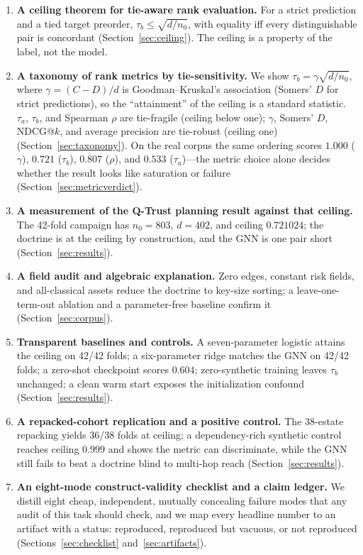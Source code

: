 \documentclass[conference,10pt]{IEEEtran}
\newcommand{\tb}{\tau_b}
\newcommand{\distinct}{d}
\newcommand{\nzero}{n_0}
\begin{document}
\begin{enumerate}
\item \textbf{A ceiling theorem for tie-aware rank evaluation.} For a strict prediction and a
tied target preorder, $\tb\le\sqrt{\distinct/\nzero}$, with equality iff every distinguishable
pair is concordant (Section~\ref{sec:ceiling}). The ceiling is a property of the label, not the
model.
\item \textbf{A taxonomy of rank metrics by tie-sensitivity.} We show $\tb=\gamma\sqrt{\distinct/\nzero}$,
where $\gamma=(C-D)/\distinct$ is Goodman--Kruskal's association (Somers' $D$ for strict
predictions), so the ``attainment'' of the ceiling is a standard statistic. $\tau_a$, $\tb$, and
Spearman $\rho$ are tie-fragile (ceiling below one); $\gamma$, Somers' $D$, NDCG@$k$, and
average precision are tie-robust (ceiling one) (Section~\ref{sec:taxonomy}). On the real corpus
the same ordering scores $1.000$ ($\gamma$), $0.721$ ($\tb$), $0.807$ ($\rho$), and $0.533$
($\tau_a$)---the metric choice alone decides whether the result looks like saturation or
failure (Section~\ref{sec:metricverdict}).
\item \textbf{A measurement of the Q-Trust planning result against that ceiling.} The 42-fold
campaign has $\nzero=803$, $\distinct=402$, and ceiling $0.721024$; the doctrine is at the
ceiling by construction, and the GNN is one pair short (Section~\ref{sec:results}).
\item \textbf{A field audit and algebraic explanation.} Zero edges, constant risk fields, and
all-classical assets reduce the doctrine to key-size sorting; a leave-one-term-out ablation and
a parameter-free baseline confirm it (Section~\ref{sec:corpus}).
\item \textbf{Transparent baselines and controls.} A seven-parameter logistic attains the
ceiling on 42/42 folds; a six-parameter ridge matches the GNN on 42/42 folds; a zero-shot
checkpoint scores $0.604$; zero-synthetic training leaves $\tb$ unchanged; a clean warm start
exposes the initialization confound (Section~\ref{sec:results}).
\item \textbf{A repacked-cohort replication and a positive control.} The 38-estate repacking
yields 36/38 folds at ceiling; a dependency-rich synthetic control reaches ceiling $0.999$ and
shows the metric can discriminate, while the GNN still fails to beat a doctrine blind to
multi-hop reach (Section~\ref{sec:results}).
\item \textbf{An eight-mode construct-validity checklist and a claim ledger.} We distill eight
cheap, independent, mutually concealing failure modes that any audit of this task should check,
and we map every headline number to an artifact with a status: reproduced, reproduced but
vacuous, or not reproduced (Sections~\ref{sec:checklist} and~\ref{sec:artifacts}).
\end{enumerate}
\end{document}
